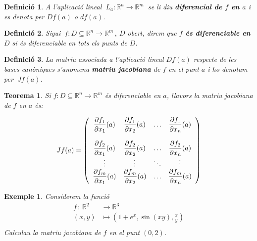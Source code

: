 \documentclass[12pt]{article}
\newtheorem{definicio}{Definici{\'o}}[subsection]
\newtheorem{teorema}{Teorema}[subsection]
\newtheorem{exemple}{Exemple}[subsection]
\newcommand{\R}{\mathbb{R}}
\begin{document}
\vspace{0.4cm}
\begin{definicio}
A l'aplicaci{\'o} lineal $\ L_a: \R^{n} \longrightarrow \R^m\ $ se li
diu \textbf{diferencial de $f$ en $a$} i es denota
per $Df(a)$ o $df(a)$.
\end{definicio}

\vspace{0.4cm}
\begin{definicio}
Sigui
$\ f:D \subseteq \R^{n} \longrightarrow \R^m\,,\ D$
obert, direm que \textbf{$f$ {\'e}s diferenciable en $D$}  si {\'e}s diferenciable en tots els punts de $D$.
\end{definicio}


\vspace{0.4cm}
\begin{definicio}
La matriu associada a l'aplicaci{\'o} lineal $Df(a)$ respecte de les bases can{\`o}niques s'anomena \textbf{matriu jacobiana} de $f$  en el punt $a$ i ho denotam per $\ Jf(a)$.
\end{definicio}

\vspace{0.4cm}
\begin{teorema}
Si $f:D \subseteq\R^n \longrightarrow \R^m$ {\'e}s diferenciable en
$a$, llavors la matriu jacobiana de $f$ en $a$ {\'e}s:


$$ Jf(a) = \left( \vspace{0.4cm}\begin{array} {cccc}
\displaystyle\frac{\partial f_1}{\partial x_1}(a) & \displaystyle\frac{\partial f_1}{\partial x_2}(a) &
\ldots & \displaystyle\frac{\partial f_1}{\partial x_n}(a)\\
\\
\displaystyle\frac{\partial f_2}{\partial x_1}(a) & \displaystyle\frac{\partial f_2}{\partial x_2}(a) &
\ldots & \displaystyle\frac{\partial f_2}{\partial x_n}(a)\\
\vdots & \vdots & \ddots & \vdots \\
\displaystyle\frac{\partial f_m}{\partial x_1}(a) & \displaystyle\frac{\partial f_m}{\partial x_2}(a) &
\ldots & \displaystyle\frac{\partial f_m}{\partial x_n}(a)\\
                   \end{array} \right) $$
\end{teorema}

\vspace{0.4cm}
\begin{exemple}
Considerem la funci{\'o}
\begin{align*}
    f\, :\, \R^2 & \longrightarrow  \R^3 \\
    (x,y) & \mapsto \left( 1+e^x,\sin(xy),\frac{x}{y} \right) \\
\end{align*}
Calculau la matriu jacobiana de $f$ en el punt $(0,2)$.
\end{exemple}
\end{document}
